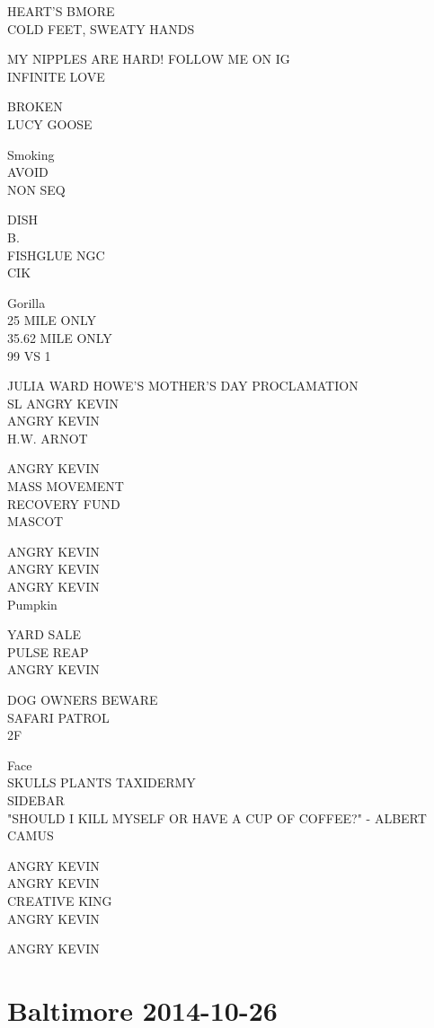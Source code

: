 \documentclass[10pt,letterpaper]{article}
\begin{document}
HEART'S BMORE\\
COLD FEET, SWEATY HANDS

MY NIPPLES ARE HARD!  FOLLOW ME ON IG\\
INFINITE LOVE

BROKEN\\
LUCY GOOSE

Smoking\\
AVOID\\
NON SEQ

DISH\\
B.\\
FISHGLUE NGC\\
CIK

Gorilla\\
25 MILE ONLY\\
35.62 MILE ONLY\\
99 VS 1

JULIA WARD HOWE'S MOTHER'S DAY PROCLAMATION\\
SL ANGRY KEVIN\\
ANGRY KEVIN\\
H.W. ARNOT

ANGRY KEVIN\\
MASS MOVEMENT\\
RECOVERY FUND\\
MASCOT

ANGRY KEVIN\\
ANGRY KEVIN\\
ANGRY KEVIN\\
Pumpkin

YARD SALE\\
PULSE REAP\\
ANGRY KEVIN

DOG OWNERS BEWARE\\
SAFARI PATROL\\
2F

Face\\
SKULLS PLANTS TAXIDERMY\\
SIDEBAR\\
"SHOULD I KILL MYSELF OR HAVE A CUP OF COFFEE?" {-} ALBERT CAMUS

ANGRY KEVIN\\
ANGRY KEVIN\\
CREATIVE KING\\
ANGRY KEVIN

ANGRY KEVIN
\

\section*{Baltimore 2014-10-26}
\end{document}
